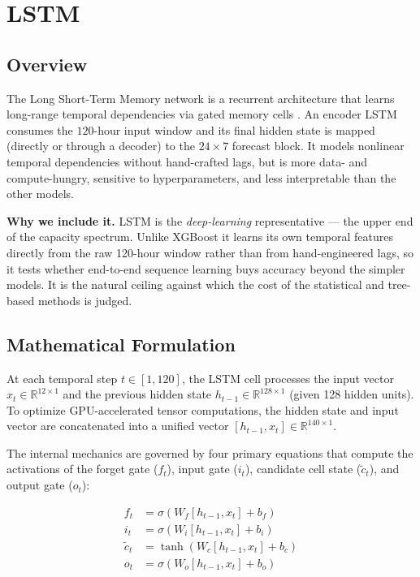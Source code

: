 \documentclass[12pt,a4paper,oneside]{report}
\begin{document}
\section{LSTM}
\label{sec:lstm}
\subsection{Overview}
The Long Short-Term Memory network is a recurrent architecture that learns
long-range temporal dependencies via gated memory cells \citep{hochreiter1997lstm}.
An encoder LSTM consumes the $120$-hour input window and its final hidden state is
mapped (directly or through a decoder) to the $24 \times 7$ forecast block. It
models nonlinear temporal dependencies without hand-crafted lags, but is more data-
and compute-hungry, sensitive to hyperparameters, and less interpretable than the
other models.

\textbf{Why we include it.} LSTM is the \emph{deep-learning} representative ---
the upper end of the capacity spectrum. Unlike XGBoost it learns its own temporal
features directly from the raw 120-hour window rather than from hand-engineered
lags, so it tests whether end-to-end sequence learning buys accuracy beyond the
simpler models. It is the natural ceiling against which the cost of the
statistical and tree-based methods is judged.

\subsection{Mathematical Formulation}
At each temporal step $t \in [1, 120]$, the LSTM cell processes the input vector $x_t \in \mathbb{R}^{12 \times 1}$ and the previous hidden state $h_{t-1} \in \mathbb{R}^{128 \times 1}$ (given 128 hidden units). To optimize GPU-accelerated tensor computations, the hidden state and input vector are concatenated into a unified vector $[h_{t-1}, x_t] \in \mathbb{R}^{140 \times 1}$. 

The internal mechanics are governed by four primary equations that compute the activations of the forget gate ($f_t$), input gate ($i_t$), candidate cell state ($\tilde{c}_t$), and output gate ($o_t$):

\begin{align}
f_t &= \sigma(W_f [h_{t-1}, x_t] + b_f) \label{eq:lstm_forget} \\
i_t &= \sigma(W_i [h_{t-1}, x_t] + b_i) \label{eq:lstm_input} \\
\tilde{c}_t &= \tanh(W_c [h_{t-1}, x_t] + b_c) \label{eq:lstm_candidate} \\
o_t &= \sigma(W_o [h_{t-1}, x_t] + b_o) \label{eq:lstm_output}
\end{align}
\end{document}
